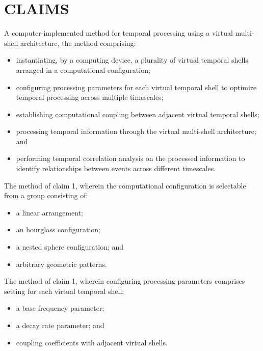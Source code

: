 \documentclass[12pt,letterpaper]{article}
\begin{document}
\newpage
\section*{CLAIMS}

\begin{patentclaims}
    \item A computer-implemented method for temporal processing using a virtual multi-shell architecture, the method comprising:
    \begin{itemize}[leftmargin=2em]
        \item instantiating, by a computing device, a plurality of virtual temporal shells arranged in a computational configuration;
        \item configuring processing parameters for each virtual temporal shell to optimize temporal processing across multiple timescales;
        \item establishing computational coupling between adjacent virtual temporal shells;
        \item processing temporal information through the virtual multi-shell architecture; and
        \item performing temporal correlation analysis on the processed information to identify relationships between events across different timescales.
    \end{itemize}
    
    \item The method of claim 1, wherein the computational configuration is selectable from a group consisting of:
    \begin{itemize}[leftmargin=2em]
        \item a linear arrangement;
        \item an hourglass configuration;
        \item a nested sphere configuration; and
        \item arbitrary geometric patterns.
    \end{itemize}
    
    \item The method of claim 1, wherein configuring processing parameters comprises setting for each virtual temporal shell:
    \begin{itemize}[leftmargin=2em]
        \item a base frequency parameter;
        \item a decay rate parameter; and
        \item coupling coefficients with adjacent virtual shells.
    \end{itemize}
    

\end{patentclaims}
\end{document}
